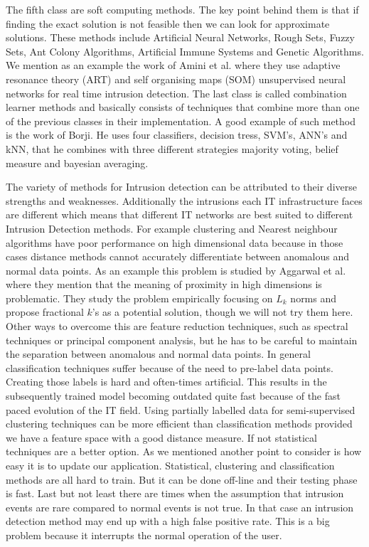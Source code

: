 \documentclass[reqno,openany,12pt]{amsbook}
\begin{document}
The fifth class are soft computing methods.
The key point behind them is that if finding the exact solution is not feasible then we can look for approximate solutions. These methods include Artificial Neural Networks, Rough Sets, Fuzzy Sets, Ant Colony Algorithms, Artificial Immune Systems and Genetic Algorithms. We mention as an example the work of Amini et al.\cite{meth5} where they use adaptive resonance theory (ART) and self organising maps (SOM) unsupervised neural networks for real time intrusion detection.
The last class is called combination learner methods and basically consists of techniques that combine more than one of the previous classes in their implementation. A good example of such method is the work of Borji\cite{meth6}. He uses four classifiers, decision tress, SVM's, ANN's and kNN, that he combines with three different strategies majority voting, belief measure and bayesian averaging.


The variety of methods for Intrusion detection can be attributed to their diverse strengths and weaknesses. Additionally the intrusions each IT infrastructure faces are different which means that different IT networks are best suited to different Intrusion Detection methods. For example clustering and Nearest neighbour algorithms have poor performance on high dimensional data because in those cases distance methods cannot accurately differentiate between anomalous and normal data points. As an example this problem is studied by Aggarwal et al.\cite{meth7} where they mention that the meaning of proximity in high dimensions is problematic. They study the problem empirically focusing on $L_k$ norms and propose fractional $k$'s as a potential solution, though we will not try them here.
Other ways to overcome this are feature reduction techniques, such as spectral techniques or principal component analysis, but he has to be careful to maintain the separation between anomalous and normal data points. In general classification techniques suffer because of the need to pre-label data points. Creating those labels is hard and often-times artificial. This results in the subsequently trained model becoming outdated quite fast because of the fast paced evolution of the IT field. Using partially labelled data for semi-supervised clustering techniques can be more efficient than classification methods provided we have a feature space with a good distance measure. If not statistical techniques are a better option. As we mentioned another point to consider is how easy it is to update our application. Statistical, clustering and classification methods are all hard to train. But it can be done off-line and their testing phase is fast. Last but not least there are times when the assumption that intrusion events are rare compared to normal events is not true. In that case an intrusion detection method may end up with a high false positive rate. This is a big problem because it interrupts the normal operation of the user.
\end{document}

